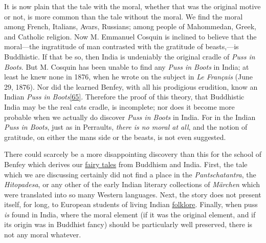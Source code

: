 \documentclass[14pt,a4paper]{memoir}
\newcommand{\ul}[1]{\uline{#1}}
\begin{document}
It is now plain that the tale with the moral, whether that was the
original motive or not, is more common than the tale without the moral.
We find the moral among French, Italians, Avars, Russians; among people
of Mahommedan, Greek, and Catholic religion. Now M. Emmanuel Cosquin is
inclined to believe that the moral---the ingratitude of man contrasted
with the gratitude of beasts,---is Buddhistic. If that be so, then India
is undeniably the original cradle of \emph{Puss in Boots}. But M.
Cosquin has been unable to find any \emph{Puss in Boots} in India; at
least he knew none in 1876, when he wrote on the subject in \emph{Le
Français} (June 29, 1876). Nor did the learned Benfey, with all his
prodigious erudition, know an Indian \emph{Puss in
Boots}\protect\hypertarget{4533318093929944247_33931-h-0.htm.xhtmlux5cux23FNanchor_65}{}{}\protect\hyperlink{4533318093929944247_33931-h-1.htm.xhtmlux5cux23Footnote_65}{{[}65{]}}.
Therefore the proof of this theory, that Buddhistic India may be the
real cat\textquotesingle s cradle, is incomplete; nor does it become
more probable when we actually do discover \emph{Puss in Boots} in
India. For in the Indian \emph{Puss in Boots}, just as in
Perrault\textquotesingle s, \emph{there is no moral at all}, and the
notion of gratitude, on either the man\textquotesingle s side or the
beast\textquotesingle s, is not even suggested.

There could scarcely be a more disappointing discovery than this for the
school of Benfey which derives our \ul{fairy tales} from Buddhism and
India. First, the tale which we are discussing certainly did not find a
place in the \emph{Pantschatantra}, the \emph{Hitopadesa}, or any other
of the early Indian literary collections of \emph{Märchen} which were
translated into so many Western languages. Next, the story does not
present itself, for long, to European students of living Indian
\ul{folklore}. Finally, when puss \emph{is} found in India, where the
moral element (if it was the original element, and if its origin was in
Buddhist fancy) should be particularly well preserved, there is not any
moral whatever.
\end{document}
